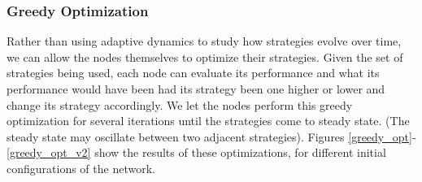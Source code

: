 \documentclass{article}
\begin{document}
\subsubsection{Greedy Optimization}

Rather than using adaptive dynamics to study how strategies evolve over time, we can allow the nodes themselves to optimize their strategies.  Given the set of strategies being used, each node can evaluate its performance and what its performance would have been had its strategy been one higher or lower and change its strategy accordingly.  We let the nodes perform this greedy optimization for several iterations until the strategies come to steady state.  (The steady state may oscillate between two adjacent strategies).  
Figures \ref{greedy_opt}-\ref{greedy_opt_v2} show the results of these optimizations, for different initial configurations of the network.  
\end{document}
